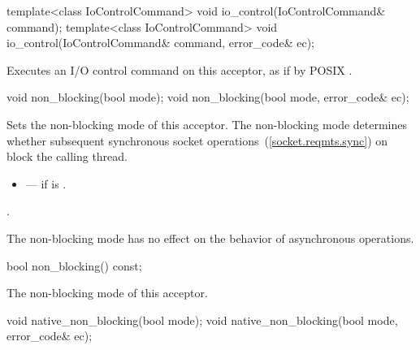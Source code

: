 \begin{itemdecl}
template<class IoControlCommand>
  void io_control(IoControlCommand& command);
template<class IoControlCommand>
  void io_control(IoControlCommand& command, error_code& ec);
\end{itemdecl}

\begin{itemdescr}
\pnum
\effects Executes an I/O control command on this acceptor, as if by POSIX .
\end{itemdescr}

\begin{itemdecl}
void non_blocking(bool mode);
void non_blocking(bool mode, error_code& ec);
\end{itemdecl}

\begin{itemdescr}
\pnum
\effects Sets the non-blocking mode of this acceptor. The non-blocking mode determines whether subsequent synchronous socket operations~(\ref{socket.reqmts.sync}) on  block the calling thread.

\pnum
\errors
\begin{itemize}
\item
{} --- if  is .
\end{itemize}

\pnum
\postconditions {}.

\pnum
 \enternote The non-blocking mode has no effect on the behavior of asynchronous operations. \exitnote
\end{itemdescr}

\begin{itemdecl}
bool non_blocking() const;
\end{itemdecl}

\begin{itemdescr}
\pnum
\returns The non-blocking mode of this acceptor.
\end{itemdescr}

\begin{itemdecl}
void native_non_blocking(bool mode);
void native_non_blocking(bool mode, error_code& ec);
\end{itemdecl}

